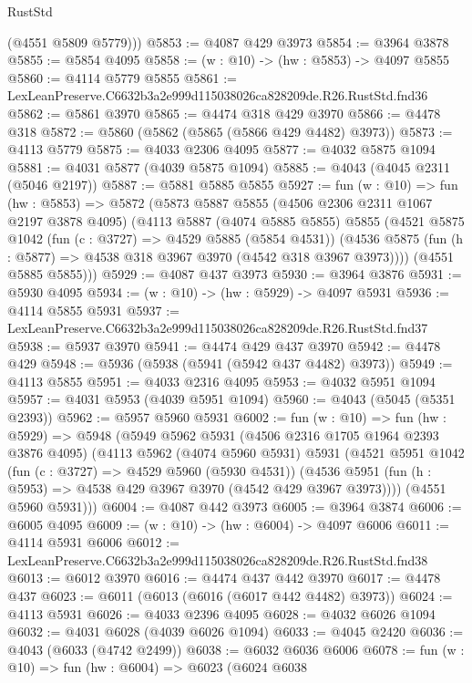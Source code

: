 \begin{lexlean}{RustStd}
\begin{coremodule}
        (@4551 @5809 @5779)))
@5853 := @4087 @429 @3973
@5854 := @3964 @3878
@5855 := @5854 @4095
@5858 := (w : @10) -> (hw : @5853) -> @4097 @5855
@5860 := @4114 @5779 @5855
@5861 := LexLeanPreserve.C6632b3a2e999d115038026ca828209de.R26.RustStd.fnd36
@5862 := @5861 @3970
@5865 := @4474 @318 @429 @3970
@5866 := @4478 @318
@5872 := @5860 (@5862 (@5865 (@5866 @429 @4482) @3973))
@5873 := @4113 @5779
@5875 := @4033 @2306 @4095
@5877 := @4032 @5875 @1094
@5881 := @4031 @5877 (@4039 @5875 @1094)
@5885 := @4043 (@4045 @2311 (@5046 @2197))
@5887 := @5881 @5885 @5855
@5927 := fun (w : @10) =>
  fun (hw : @5853) =>
  @5872
    (@5873
      @5887
      @5855
      (@4506 @2306 @2311 @1067 @2197 @3878 @4095)
      (@4113
        @5887
        (@4074 @5885 @5855)
        @5855
        (@4521
          @5875
          @1042
          (fun (c : @3727) => @4529 @5885 (@5854 @4531))
          (@4536 @5875 (fun (h : @5877) => @4538 @318 @3967 @3970 (@4542 @318 @3967 @3973))))
        (@4551 @5885 @5855)))
@5929 := @4087 @437 @3973
@5930 := @3964 @3876
@5931 := @5930 @4095
@5934 := (w : @10) -> (hw : @5929) -> @4097 @5931
@5936 := @4114 @5855 @5931
@5937 := LexLeanPreserve.C6632b3a2e999d115038026ca828209de.R26.RustStd.fnd37
@5938 := @5937 @3970
@5941 := @4474 @429 @437 @3970
@5942 := @4478 @429
@5948 := @5936 (@5938 (@5941 (@5942 @437 @4482) @3973))
@5949 := @4113 @5855
@5951 := @4033 @2316 @4095
@5953 := @4032 @5951 @1094
@5957 := @4031 @5953 (@4039 @5951 @1094)
@5960 := @4043 (@5045 (@5351 @2393))
@5962 := @5957 @5960 @5931
@6002 := fun (w : @10) =>
  fun (hw : @5929) =>
  @5948
    (@5949
      @5962
      @5931
      (@4506 @2316 @1705 @1964 @2393 @3876 @4095)
      (@4113
        @5962
        (@4074 @5960 @5931)
        @5931
        (@4521
          @5951
          @1042
          (fun (c : @3727) => @4529 @5960 (@5930 @4531))
          (@4536 @5951 (fun (h : @5953) => @4538 @429 @3967 @3970 (@4542 @429 @3967 @3973))))
        (@4551 @5960 @5931)))
@6004 := @4087 @442 @3973
@6005 := @3964 @3874
@6006 := @6005 @4095
@6009 := (w : @10) -> (hw : @6004) -> @4097 @6006
@6011 := @4114 @5931 @6006
@6012 := LexLeanPreserve.C6632b3a2e999d115038026ca828209de.R26.RustStd.fnd38
@6013 := @6012 @3970
@6016 := @4474 @437 @442 @3970
@6017 := @4478 @437
@6023 := @6011 (@6013 (@6016 (@6017 @442 @4482) @3973))
@6024 := @4113 @5931
@6026 := @4033 @2396 @4095
@6028 := @4032 @6026 @1094
@6032 := @4031 @6028 (@4039 @6026 @1094)
@6033 := @4045 @2420
@6036 := @4043 (@6033 (@4742 @2499))
@6038 := @6032 @6036 @6006
@6078 := fun (w : @10) =>
  fun (hw : @6004) =>
  @6023
    (@6024
      @6038

\end{coremodule}
\end{lexlean}
